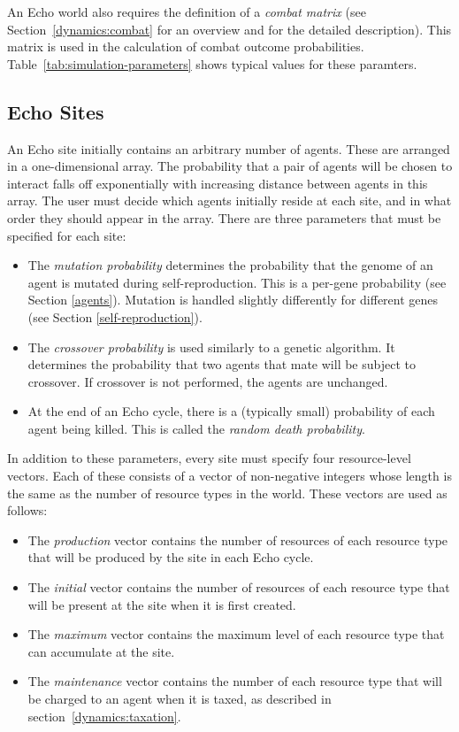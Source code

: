 An Echo world also requires the definition of a {\em combat matrix}
(see Section~\ref{dynamics:combat} for an overview and
\cite{Holland92} for the detailed description).  This matrix is used
in the calculation of combat outcome probabilities.  
Table~\ref{tab:simulation-parameters} shows typical values for
these paramters.

\subsection{Echo Sites}

An Echo site initially contains an arbitrary number of agents.
These are arranged in a one-dimensional array. The probability that a
pair of agents will be chosen to interact falls off exponentially with
increasing distance between agents in this array. The user must decide
which agents initially reside at each site, and in what order they
should appear in the array.  There are three parameters that must
be specified for each site:
\begin{itemize}
\item The {\em mutation probability\/} determines the
probability that the genome of
an agent is mutated during self-reproduction.  This is a per-gene
probability (see Section \ref{agents}).  Mutation is
handled slightly differently for different genes (see Section
\ref{self-reproduction}).
  
\item The {\em crossover probability\/} is used similarly to a genetic
algorithm.  It determines the probability that two agents that mate
will be subject to crossover.  If crossover is not performed, the
agents are unchanged.

\item At the end of an Echo cycle, there is a (typically small)
probability of each agent being killed.  This is called the {\em
random death probability}.
\end{itemize}

In addition to these parameters, every site must specify four
resource-level vectors. Each of these consists of a vector of
non-negative integers whose length is the same as the number of
resource types in the world.  These vectors are used as follows:
\begin{itemize}
\item The {\em production\/} vector contains the number of resources
  of each resource type that will be produced by the site in each Echo
  cycle.

\item The {\em initial\/} vector contains the number of resources of
  each resource type that will be present at the site when it is first
  created.

\item The {\em maximum\/} vector contains the maximum level of each
  resource type that can accumulate at the site.

\item The {\em maintenance\/} vector contains the number of each
  resource type that will be charged to an agent when it is taxed, as
  described in section~\ref{dynamics:taxation}.
\end{itemize}

